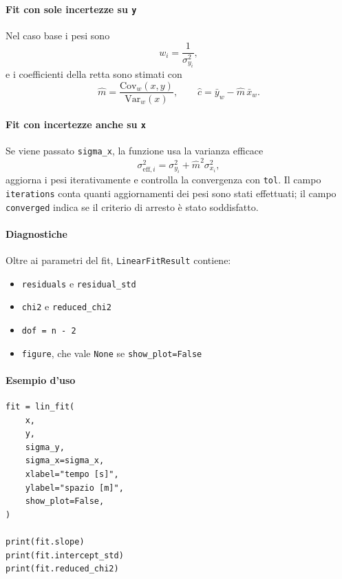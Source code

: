 \paragraph{Fit con sole incertezze su \texttt{y}}
Nel caso base i pesi sono
\[
  w_i = \frac{1}{\sigma_{y_i}^2},
\]
e i coefficienti della retta sono stimati con
\[
  \hat{m} = \frac{\mathrm{Cov}_w(x,y)}{\mathrm{Var}_w(x)}, \qquad
  \hat{c} = \bar{y}_w - \hat{m}\,\bar{x}_w.
\]

\paragraph{Fit con incertezze anche su \texttt{x}}
Se viene passato \texttt{sigma\_x}, la funzione usa la varianza efficace
\[
  \sigma_{\mathrm{eff},i}^2 = \sigma_{y_i}^2 + \hat{m}^2 \sigma_{x_i}^2,
\]
aggiorna i pesi iterativamente e controlla la convergenza con \texttt{tol}. Il campo \texttt{iterations} conta quanti aggiornamenti dei pesi sono stati effettuati; il campo \texttt{converged} indica se il criterio di arresto è stato soddisfatto.

\paragraph{Diagnostiche}
Oltre ai parametri del fit, \texttt{LinearFitResult} contiene:
\begin{itemize}
  \item \texttt{residuals} e \texttt{residual\_std}
  \item \texttt{chi2} e \texttt{reduced\_chi2}
  \item \texttt{dof = n - 2}
  \item \texttt{figure}, che vale \texttt{None} se \texttt{show\_plot=False}
\end{itemize}

\paragraph{Esempio d'uso}
\begin{verbatim}
fit = lin_fit(
    x,
    y,
    sigma_y,
    sigma_x=sigma_x,
    xlabel="tempo [s]",
    ylabel="spazio [m]",
    show_plot=False,
)

print(fit.slope)
print(fit.intercept_std)
print(fit.reduced_chi2)
\end{verbatim}
